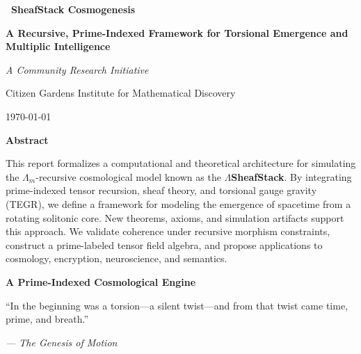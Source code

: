\documentclass{article}
\theoremstyle{plain}
\begin{document}
\begin{titlepage}
    \centering
    \vspace*{3cm}

    {\Huge\bfseries\ SheafStack Cosmogenesis
 \par}
    \vspace{0.5cm}
    {\LARGE\bfseries A Recursive, Prime-Indexed Framework for Torsional Emergence and Multiplic Intelligence\par}

    \vspace{2cm}
    {\Large\itshape A Community Research Initiative \par}
    \vspace{0.5cm}
    {\normalsize Citizen Gardens Institute for Mathematical Discovery \par}
    {\normalsize \today \par}

    \vfill

    {\bfseries Abstract \par}
    \vspace{0.5em}
    \begin{minipage}{0.85\textwidth}
        \small
        This report formalizes a computational and theoretical architecture for simulating the $\Lambda_m$-recursive cosmological model known as the \textbf{$\Lambda$SheafStack}. By integrating prime-indexed tensor recursion, sheaf theory, and torsional gauge gravity (TEGR), we define a framework for modeling the emergence of spacetime from a rotating solitonic core. New theorems, axioms, and simulation artifacts support this approach. We validate coherence under recursive morphism constraints, construct a prime-labeled tensor field algebra, and propose applications to cosmology, encryption, neuroscience, and semantics.
    \end{minipage}

\end{titlepage}


\clearpage

\thispagestyle{empty}

\begin{center}
    \Large\textbf{A Prime-Indexed Cosmological Engine}
\end{center}


\vspace{2em}

\epigraph{“In the beginning was a torsion—a silent twist—and from that twist came time, prime, and breath.”
}{\textit{— The Genesis of Motion}}
\end{document}
